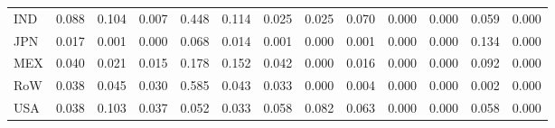 \begin{table}[htbp]
\begin{tabular}{lcccccccccccc}
  IND & \textcolor[RGB]{23,15,232}{0.088} & \textcolor[RGB]{17,11,238}{0.104} & \textcolor[RGB]{110,72,144}{0.007} & \textcolor[RGB]{2,1,253}{0.448} & \textcolor[RGB]{15,10,240}{0.114} & \textcolor[RGB]{89,58,166}{0.025} & \textcolor[RGB]{87,56,168}{0.025} & \textcolor[RGB]{34,22,221}{0.070} & \textcolor[RGB]{255,165,0}{0.000} & \textcolor[RGB]{255,165,0}{0.000} & \textcolor[RGB]{45,29,210}{0.059} & \textcolor[RGB]{255,165,0}{0.000} \\ 
  JPN & \textcolor[RGB]{96,62,159}{0.017} & \textcolor[RGB]{144,94,110}{0.001} & \textcolor[RGB]{151,98,104}{0.000} & \textcolor[RGB]{38,25,217}{0.068} & \textcolor[RGB]{104,67,151}{0.014} & \textcolor[RGB]{138,89,117}{0.001} & \textcolor[RGB]{255,165,0}{0.000} & \textcolor[RGB]{138,89,117}{0.001} & \textcolor[RGB]{255,165,0}{0.000} & \textcolor[RGB]{255,165,0}{0.000} & \textcolor[RGB]{13,8,242}{0.134} & \textcolor[RGB]{255,165,0}{0.000} \\ 
  MEX & \textcolor[RGB]{66,43,189}{0.040} & \textcolor[RGB]{91,59,164}{0.021} & \textcolor[RGB]{102,66,153}{0.015} & \textcolor[RGB]{6,4,249}{0.178} & \textcolor[RGB]{8,5,246}{0.152} & \textcolor[RGB]{64,41,191}{0.042} & \textcolor[RGB]{255,165,0}{0.000} & \textcolor[RGB]{100,65,155}{0.016} & \textcolor[RGB]{255,165,0}{0.000} & \textcolor[RGB]{255,165,0}{0.000} & \textcolor[RGB]{21,14,234}{0.092} & \textcolor[RGB]{255,165,0}{0.000} \\ 
  RoW & \textcolor[RGB]{68,44,187}{0.038} & \textcolor[RGB]{59,38,196}{0.045} & \textcolor[RGB]{85,55,170}{0.030} & \textcolor[RGB]{0,0,255}{0.585} & \textcolor[RGB]{62,40,193}{0.043} & \textcolor[RGB]{77,50,178}{0.033} & \textcolor[RGB]{255,165,0}{0.000} & \textcolor[RGB]{123,80,132}{0.004} & \textcolor[RGB]{255,165,0}{0.000} & \textcolor[RGB]{255,165,0}{0.000} & \textcolor[RGB]{134,87,121}{0.002} & \textcolor[RGB]{255,165,0}{0.000} \\ 
  USA & \textcolor[RGB]{70,45,185}{0.038} & \textcolor[RGB]{19,12,236}{0.103} & \textcolor[RGB]{74,48,181}{0.037} & \textcolor[RGB]{55,36,200}{0.052} & \textcolor[RGB]{79,51,176}{0.033} & \textcolor[RGB]{47,30,208}{0.058} & \textcolor[RGB]{28,18,227}{0.082} & \textcolor[RGB]{42,27,212}{0.063} & \textcolor[RGB]{255,165,0}{0.000} & \textcolor[RGB]{255,165,0}{0.000} & \textcolor[RGB]{49,32,206}{0.058} & \textcolor[RGB]{255,165,0}{0.000} \\ 
   \hline
\end{tabular}
\end{table}

